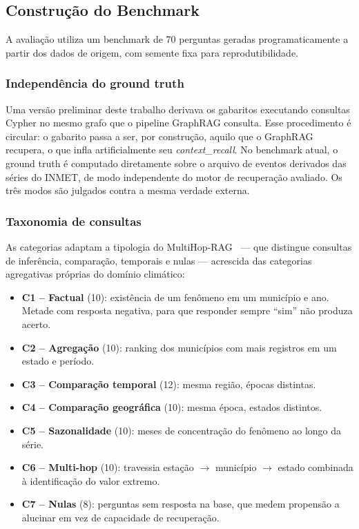 \documentclass[conference]{IEEEtran}
\begin{document}
\subsection{Construção do Benchmark}
\label{sec:benchmark}

A avaliação utiliza um benchmark de 70 perguntas geradas
programaticamente a partir dos dados de origem, com semente fixa
para reprodutibilidade.

\subsubsection{Independência do ground truth}
Uma versão preliminar deste trabalho derivava os gabaritos
executando consultas Cypher no mesmo grafo que o pipeline GraphRAG
consulta. Esse procedimento é circular: o gabarito passa a ser, por
construção, aquilo que o GraphRAG recupera, o que infla artificialmente
seu \textit{context\_recall}. No benchmark atual, o ground truth é
computado diretamente sobre o arquivo de eventos derivados das séries
do INMET, de modo independente do motor de recuperação avaliado.
Os três modos são julgados contra a mesma verdade externa.

\subsubsection{Taxonomia de consultas}
As categorias adaptam a tipologia do MultiHop-RAG~\cite{tang2024multihop}
--- que distingue consultas de inferência, comparação, temporais e
nulas --- acrescida das categorias agregativas próprias do domínio
climático:

\begin{itemize}
  \item \textbf{C1 -- Factual} (10): existência de um fenômeno em um
        município e ano. Metade com resposta negativa, para que
        responder sempre ``sim'' não produza acerto.
  \item \textbf{C2 -- Agregação} (10): ranking dos municípios com mais
        registros em um estado e período.
  \item \textbf{C3 -- Comparação temporal} (12): mesma região, épocas
        distintas.
  \item \textbf{C4 -- Comparação geográfica} (10): mesma época, estados
        distintos.
  \item \textbf{C5 -- Sazonalidade} (10): meses de concentração do
        fenômeno ao longo da série.
  \item \textbf{C6 -- Multi-hop} (10): travessia estação
        $\rightarrow$ município $\rightarrow$ estado combinada à
        identificação do valor extremo.
  \item \textbf{C7 -- Nulas} (8): perguntas sem resposta na base, que
        medem propensão a alucinar em vez de capacidade de recuperação.
\end{itemize}
\end{document}
